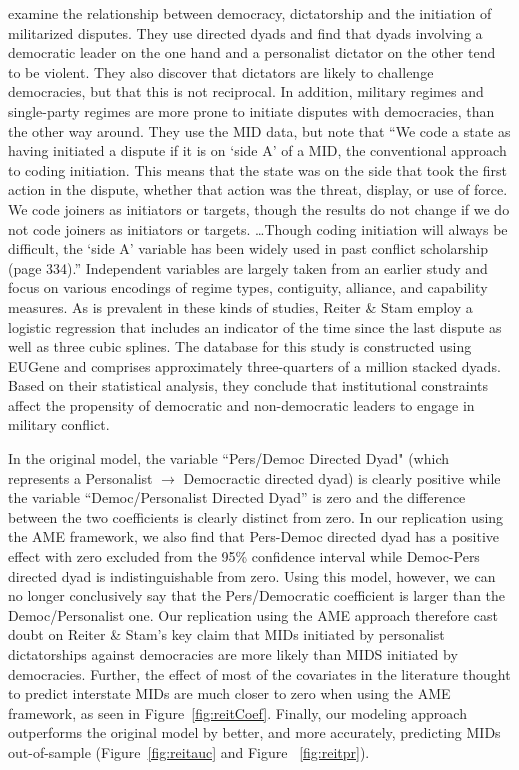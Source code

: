 \documentclass[12pt]{amsart}
\begin{document}
\citet{reiter:stam:2003} examine the relationship between democracy, dictatorship and the initiation of militarized disputes.  They use directed dyads and find that dyads involving a democratic leader on the one hand and a personalist dictator on the other tend to be violent. They also discover that dictators are likely to challenge democracies, but that this is not reciprocal.  In addition, military regimes and single-party regimes are more prone to initiate disputes with democracies, than the other way around.  They use the MID data, but note that ``We code a state as having initiated a dispute if it is on `side A' of a MID, the conventional approach to coding initiation. This means that the state was on the side that took the first action in the dispute, whether that action was the threat, display, or use of force. We code joiners as initiators or targets, though the results do not change if we do not code joiners as initiators or targets. \ldots Though coding initiation will always be difficult, the `side A' variable has been widely used in past conflict scholarship (page 334).'' Independent variables are largely taken from an earlier study and focus on various encodings of regime types, contiguity, alliance, and capability measures. As is prevalent in these kinds of studies, Reiter \& Stam employ a logistic regression that includes an indicator of the time since the last dispute as well as three cubic splines. The database for this study is constructed using EUGene \citep{bennett:stam:2000} and comprises approximately three-quarters of a million stacked dyads. Based on their statistical analysis, they conclude that institutional constraints affect the propensity of democratic and non-democratic leaders to engage in military conflict. 

In the original model, the variable ``Pers/Democ Directed Dyad" (which represents a Personalist $\rightarrow$ Democractic directed dyad) is clearly positive while the variable ``Democ/Personalist Directed Dyad'' is zero and the difference between the two coefficients is clearly distinct from zero. In our replication using the AME framework, we also find that Pers-Democ directed dyad has a positive effect with zero excluded from the 95\% confidence interval while Democ-Pers directed dyad is indistinguishable from zero. Using this model, however, we can no longer conclusively say that the Pers/Democratic coefficient is larger than the Democ/Personalist one.
Our replication using the AME approach therefore cast doubt on Reiter \& Stam's key claim that MIDs initiated by personalist dictatorships against democracies are more likely than MIDS initiated by democracies. Further, the effect of most of the covariates in the literature thought to predict interstate MIDs are much closer to zero when using the AME framework, as seen in Figure~\ref{fig:reitCoef}. Finally, our modeling approach outperforms the original model by better, and more accurately, predicting MIDs out-of-sample (Figure~\ref{fig:reitauc} and Figure ~\ref{fig:reitpr}).  
\end{document}
